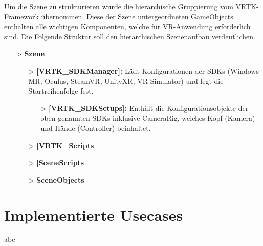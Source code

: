 Um die Szene zu strukturieren wurde die hierarchische Gruppierung vom VRTK-Framework übernommen. Diese der Szene untergeordneten GameObjects enthalten alle wichtigen Komponenten, welche für VR-Anwendung erforderlich sind. Die Folgende Struktur soll den hierarchischen Szenenaufbau verdeutlichen.

\begin{itemize}
\item[>] \textbf{Szene} 
	
	\begin{itemize}
	\item[>] \textbf{[VRTK\_SDKManager]:} Lädt Konfigurationen der SDKs (Windows MR, Oculus, SteamVR, UnityXR, VR-Simulator) und legt die Startreihenfolge fest.  	

		\begin{itemize}
			\item[>]\textbf{[VRTK\_SDKSetups]:} Enthält die Konfigurationsobjekte der oben genannten SDKs inklusive CameraRig, welches Kopf (Kamera) und Hände (Controller) beinhaltet.  		
		\end{itemize}
	
	\item[>] \textbf{[VRTK\_Scripts]}
	
	\item[>] \textbf{[SceneScripts]}
	
	\item[>] \textbf{SceneObjects}
	\end{itemize}
	
\end{itemize}

\section{Implementierte Usecases}
\label{sec:ImplementierteUsecases}
abc
